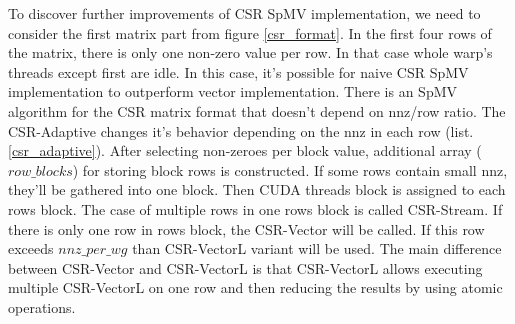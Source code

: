 \documentclass{article}
\begin{document}
\begin{figure}[H]
\centering
{}
\qquad %
\end{figure}

To discover further improvements of CSR SpMV implementation, we need to consider the first matrix part from figure \ref{csr_format}. In the first four rows
of the matrix, there is only one non-zero value per row. In that case whole warp's threads except first are idle. In this case, it's possible
for naive CSR SpMV implementation to outperform vector implementation. There is an SpMV algorithm for the CSR matrix format that doesn't depend on nnz/row ratio.
The CSR-Adaptive changes it's behavior depending on the nnz in each row (list. \ref{csr_adaptive}). After selecting non-zeroes per block value,
additional array ($row\_blocks$) for storing block rows is constructed. If some rows contain small nnz, they'll be gathered into one block. Then
CUDA threads block is assigned to each rows block. The case of multiple rows in one rows block is called CSR-Stream. If there is only one row
in rows block, the CSR-Vector will be called. If this row exceeds $nnz\_per\_wg$ than CSR-VectorL variant will be used. The main difference between
CSR-Vector and CSR-VectorL is that CSR-VectorL allows executing multiple CSR-VectorL on one row and then reducing the results by using atomic operations.
\end{document}
